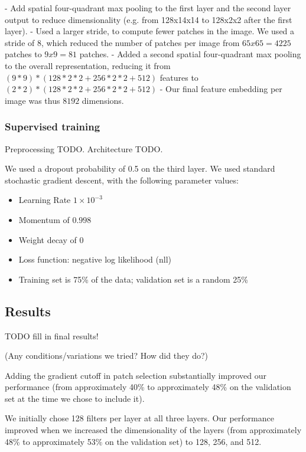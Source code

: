 \documentclass{article} %
\newenvironment{itemizedense}{
\begin{itemize}
  \setlength{\itemsep}{1pt}
  \setlength{\parskip}{0pt}
  \setlength{\parsep}{0pt}
}{\end{itemize}}
\begin{document}
- Add spatial four-quadrant max pooling to the first layer and the second layer output to reduce dimensionality (e.g. from 128x14x14 to 128x2x2 after the first layer).
- Used a larger stride, to compute fewer patches in the image. We used a stride of 8, which reduced the number of patches per image from $65x65=4225$ patches to $9x9 = 81$ patches.
- Added a second spatial four-quadrant max pooling to the overall representation, reducing it from $(9*9) * (128 * 2 * 2 + 256 * 2 * 2 + 512)$ features to $(2*2) * (128 * 2 * 2 + 256 * 2 * 2 + 512)$
- Our final feature embedding per image was thus $8192$ dimensions.

\subsubsection{Supervised training}

Preprocessing TODO. Architecture TODO.

We used a dropout probability of 0.5 on the third layer. We used standard stochastic gradient descent, with the following parameter values:

\begin{itemizedense}
\item Learning Rate $1 \times 10^{-3}$
\item Momentum of $0.998$
\item Weight decay of $0$
\item Loss function: negative log likelihood (nll)
\item Training set is 75\% of the data; validation set is a random 25\%
\end{itemizedense}

\subsection{Results}

TODO fill in final results!

(Any conditions/variations we tried? How did they do?)

Adding the gradient cutoff in patch selection substantially improved our performance (from approximately 40\% to approximately 48\% on the validation set at the time we chose to include it).

We initially chose 128 filters per layer at all three layers. Our performance improved when we increased the dimensionality of the layers (from approximately 48\% to approximately 53\% on the validation set) to 128, 256, and 512. 
\end{document}
